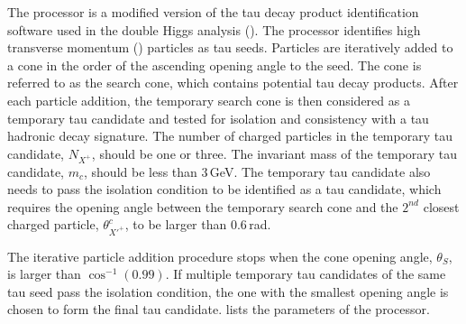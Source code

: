The \BonoTauFinder processor is a modified version of the tau decay product identification software used in the double Higgs analysis (). The processor identifies high transverse momentum (\pT) particles as tau seeds. Particles are iteratively added to a cone in the order of the ascending opening angle to the seed. The cone is referred to as the search cone, which contains potential tau decay products. After each particle addition, the temporary search cone is then considered as a temporary  tau candidate and tested for isolation and consistency  with a tau hadronic decay signature. The number of charged particles in the temporary tau candidate, $N_{X^+}$, should be one or three. The invariant mass of the temporary tau candidate, $m_{c}$, should be less than 3\,GeV. The temporary tau candidate also needs to pass the isolation condition to be identified as a tau candidate, which requires the opening angle between the temporary search cone  and the $2^{nd}$ closest charged particle, $\theta^{c}_{X'^+}$, to be larger than 0.6\,rad.

The iterative particle addition procedure stops when the cone opening angle, $\theta_S$, is larger than $\cos^{-1}(0.99)$. If multiple temporary tau candidates of the same tau seed pass the isolation condition, the one with the smallest opening angle is chosen to form the final tau candidate.  lists the parameters  of the  \BonoTauFinder processor.








